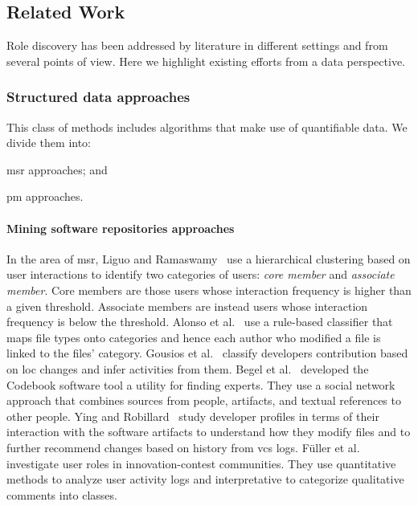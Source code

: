 \subsection{Related Work}
Role discovery has been addressed by literature in different settings and from several points of view. Here we highlight existing efforts from a data perspective.

\subsubsection{Structured data approaches}
This class of methods includes algorithms that make use of quantifiable data. We divide them into: 
\begin{inparaenum}[\itshape a)]
   \item \gls*{msr} approaches; and
   \item \gls*{pm} approaches.
\end{inparaenum}

\paragraph{Mining software repositories approaches}
In the area of \gls*{msr}, Liguo and Ramaswamy~\cite{Yu.LiguoRamaswamy.2007} use a hierarchical clustering based on user interactions to identify two categories of users: \emph{core member} and \emph{associate member}. Core members are those users whose interaction frequency is higher than a given threshold. Associate members are instead users whose interaction frequency is below the threshold.
Alonso et al.~\cite{Alonso2008} use a rule-based classifier that maps file types onto categories and hence each author who modified a file is linked to the files' category. Gousios et al.~\cite{gousios2008measuring} classify developers contribution based on \gls*{loc} changes and infer activities from them. Begel et al.~\cite{Begel2010} developed the Codebook software tool a utility for finding experts. They use a social network approach that combines sources from people, artifacts, and textual references to other people. 
Ying and Robillard~\cite{Ying2014} study developer profiles in terms of their interaction with the software artifacts to understand how they modify files and to further recommend changes based on history from \gls*{vcs} logs. Füller et al.~\cite{Fuller2014a} investigate user roles in innovation-contest communities. They use quantitative methods to analyze user activity logs and interpretative to categorize qualitative comments into classes. 

